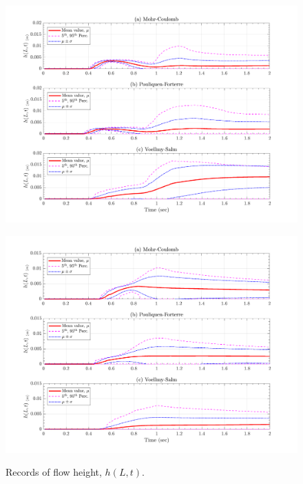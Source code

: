 \documentclass{article}
\begin{document}
\begin{figure}[H]
	\begin{minipage}[b]{0.5\linewidth}
    	\centering
    	\includegraphics[width=1\textwidth]{InclinedPlane/LocalRecords/Records/H_L3.png}
    	\label{fig:Ramp-L3-H}
	\end{minipage}
	\begin{minipage}[b]{0.5\linewidth}
		\centering
		\includegraphics[width=1\textwidth]{InclinedPlane/LocalRecords/Records/H_L4.png}
    	\label{fig:Ramp-L4-H}
    \end{minipage}
    \caption{Records of flow height, $h(L,t)$.}
    \label{fig:Ramp-LM-H}
\end{figure}
\end{document}
